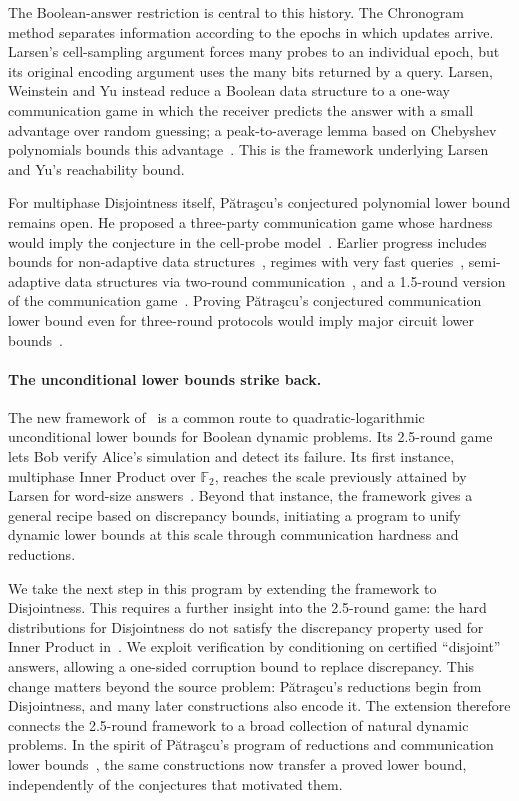 \documentclass[11pt]{article}
\theoremstyle{plain}
\theoremstyle{definition}
\theoremstyle{remark}
\newcommand{\Patrascu}{P\u{a}tra\c{s}cu\xspace}
\begin{document}
The Boolean-answer restriction is central to this history. The Chronogram method separates information according to the epochs in which updates arrive. Larsen's cell-sampling argument forces many probes to an individual epoch, but its original encoding argument uses the many bits returned by a query. Larsen, Weinstein and Yu instead reduce a Boolean data structure to a one-way communication game in which the receiver predicts the answer with a small advantage over random guessing; a peak-to-average lemma based on Chebyshev polynomials bounds this advantage~\cite{larsen_crossing_2020}. This is the framework underlying Larsen and Yu's reachability bound.

For multiphase Disjointness itself, \Patrascu's conjectured polynomial lower bound remains open. He proposed a three-party communication game whose hardness would imply the conjecture in the cell-probe model~\cite{patrascu_mihai_towards_2010}. Earlier progress includes bounds for non-adaptive data structures~\cite{brody_adapt_2015}, regimes with very fast queries~\cite{clifford_new_2015}, semi-adaptive data structures via two-round communication~\cite{ko_adaptive_2020,dvorak_lower_2020}, and a 1.5-round version of the communication game~\cite{chattopadhyay_upper_2016}. Proving \Patrascu's conjectured communication lower bound even for three-round protocols would imply major circuit lower bounds~\cite{ko_adaptive_2020}.

\paragraph{The unconditional lower bounds strike back.}
The new framework of~\cite{ko_omega_2026} is a common route to quadratic-logarithmic unconditional lower bounds for Boolean dynamic problems. Its 2.5-round game lets Bob verify Alice's simulation and detect its failure. Its first instance, multiphase Inner Product over $\mathbb F_2$, reaches the scale previously attained by Larsen for word-size answers~\cite{larsen_cell_2012}. Beyond that instance, the framework gives a general recipe based on discrepancy bounds, initiating a program to unify dynamic lower bounds at this scale through communication hardness and reductions.

We take the next step in this program by extending the framework to Disjointness. This requires a further insight into the 2.5-round game: the hard distributions for Disjointness do not satisfy the discrepancy property used for Inner Product in~\cite{ko_omega_2026}. We exploit verification by conditioning on certified ``disjoint'' answers, allowing a one-sided corruption bound to replace discrepancy. This change matters beyond the source problem: \Patrascu's reductions \cite{patrascu_mihai_towards_2010} begin from Disjointness, and many later constructions also encode it. The extension therefore connects the 2.5-round framework to a broad collection of natural dynamic problems. In the spirit of \Patrascu's program of reductions and communication lower bounds~\cite{patrascu_unifying_2008,patrascu_mihai_towards_2010}, the same constructions now transfer a proved lower bound, independently of the conjectures that motivated them.
\end{document}
